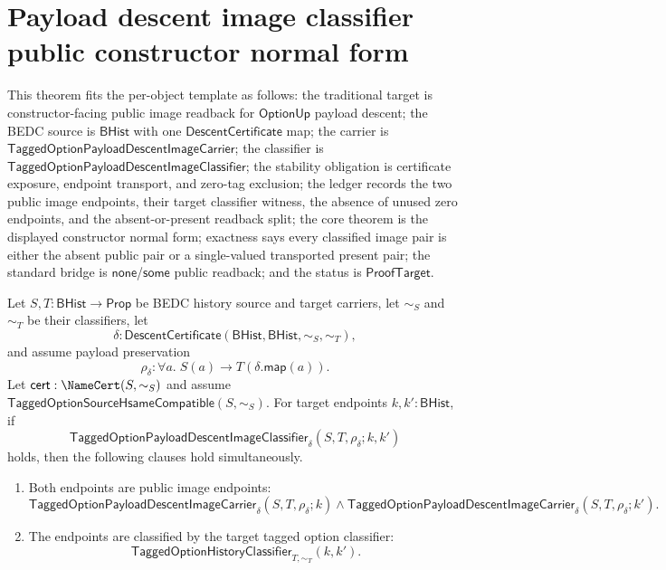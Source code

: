 
\section{Payload descent image classifier public constructor normal form}
\label{sec:option-payload-descent-image-classifier-public-constructor-normal-form}

\begin{theorem}
\label{thm:tagged-option-payload-descent-image-classifier-public-constructor-normal-form}
This theorem fits the per-object template as follows: the traditional target is
constructor-facing public image readback for $\mathsf{OptionUp}$ payload descent;
the BEDC source is $\mathsf{BHist}$ with one
$\mathsf{DescentCertificate}$ map; the carrier is
$\mathsf{TaggedOptionPayloadDescentImageCarrier}$; the classifier is
$\mathsf{TaggedOptionPayloadDescentImageClassifier}$; the stability obligation
is certificate exposure, endpoint transport, and zero-tag exclusion; the ledger
records the two public image endpoints, their target classifier witness, the
absence of unused zero endpoints, and the absent-or-present readback split; the
core theorem is the displayed constructor normal form; exactness says every
classified image pair is either the absent public pair or a single-valued
transported present pair; the standard bridge is $\mathsf{none}$/$\mathsf{some}$
public readback; and the status is $\mathsf{ProofTarget}$.

Let $S,T:\mathsf{BHist}\to\mathsf{Prop}$ be BEDC history source and target
carriers, let $\sim_S$ and $\sim_T$ be their classifiers, let
$$
\delta:\mathsf{DescentCertificate}(\mathsf{BHist},\mathsf{BHist},\sim_S,\sim_T),
$$
and assume payload preservation
$$
\rho_{\delta}:\forall a.\;S(a)\to T(\delta.\mathsf{map}(a)).
$$
Let $\mathsf{cert}:\NameCert(S,\sim_S)$ and assume
$\mathsf{TaggedOptionSourceHsameCompatible}(S,\sim_S)$. For target endpoints
$k,k':\mathsf{BHist}$, if
$$
\mathsf{TaggedOptionPayloadDescentImageClassifier}_{\delta}
(S,T,\rho_{\delta};k,k')
$$
holds, then the following clauses hold simultaneously.
\begin{enumerate}
  \item Both endpoints are public image endpoints:
  $$
  \mathsf{TaggedOptionPayloadDescentImageCarrier}_{\delta}(S,T,\rho_{\delta};k)
  \land
  \mathsf{TaggedOptionPayloadDescentImageCarrier}_{\delta}(S,T,\rho_{\delta};k').
  $$

  \item The endpoints are classified by the target tagged option classifier:
  $$
  \mathsf{TaggedOptionHistoryClassifier}_{T,\sim_T}(k,k').
  $$


\end{enumerate}
\end{theorem}
